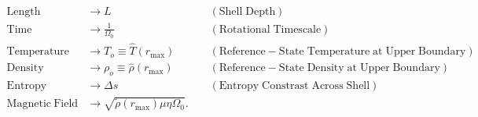 \documentclass[10pt, letterpaper]{article}
\begin{document}
\begin{align*}
\mathrm{Length} &\rightarrow L &\;\;\;\; \mathrm{(Shell\; Depth)} \\
\mathrm{Time} &\rightarrow   \frac{1}{\Omega_0} &\;\;\;\; \mathrm{(Rotational\; Timescale)}\\
\mathrm{Temperature} &\rightarrow T_o\equiv\hat{T}(r_\mathrm{max})&\;\;\;\; \mathrm{(Reference-State\; Temperature\; at\; Upper\; Boundary)} \\
\mathrm{Density} &\rightarrow \rho_o\equiv\hat{\rho}(r_\mathrm{max})&\;\;\;\; \mathrm{(Reference-State\; Density\; at\; Upper\; Boundary)} \\
\mathrm{Entropy} &\rightarrow \Delta{s}&\;\;\;\; \mathrm{(Entropy\; Constrast\; Across\; Shell)} \\
\mathrm{Magnetic~Field} &\rightarrow \sqrt{\tilde{\rho}(r_\mathrm{max})\mu\eta\Omega_0}.
\end{align*}
\end{document}

